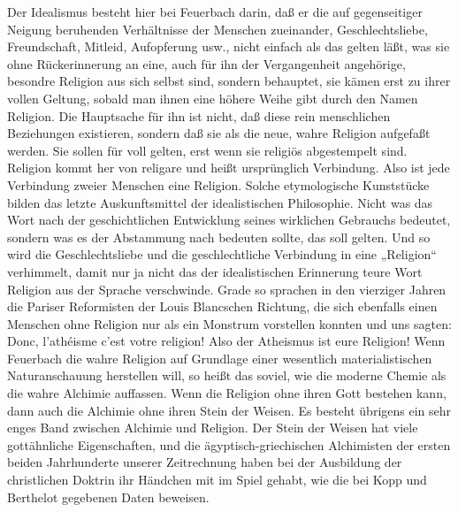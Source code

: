 Der Idealismus besteht hier bei Feuerbach darin, daß er die auf
gegenseitiger Neigung beruhenden Verhältnisse der Menschen zueinander,
Geschlechtsliebe, Freundschaft, Mitleid, Aufopferung usw., nicht einfach
als das gelten läßt, was sie ohne Rückerinnerung an eine, auch für ihn
der Vergangenheit angehörige, besondre Religion aus sich selbst sind,
sondern behauptet, sie kämen erst zu ihrer vollen Geltung, sobald man
ihnen eine höhere Weihe gibt durch den Namen Religion. Die Hauptsache
für ihn ist nicht, daß diese rein menschlichen Beziehungen existieren,
sondern daß sie als die neue, wahre Religion aufgefaßt werden. Sie
sollen für voll gelten, erst wenn sie religiös abgestempelt sind.
Religion kommt her von religare und heißt ursprünglich Verbindung. Also
ist jede Verbindung zweier Menschen eine Religion. Solche etymologische
Kunststücke bilden das letzte Auskunftsmittel der idealistischen
Philosophie. Nicht was das Wort nach der geschichtlichen Entwicklung
seines wirklichen Gebrauchs bedeutet, sondern was es der Abstammung nach
bedeuten sollte, das soll gelten. Und so wird die Geschlechtsliebe und
die geschlechtliche Verbindung in eine „Religion`` verhimmelt, damit nur
ja nicht das der idealistischen Erinnerung teure Wort Religion aus der
Sprache verschwinde. Grade so sprachen in den vierziger Jahren die
Pariser Reformisten der Louis Blancschen Richtung, die sich ebenfalls
einen Menschen ohne Religion nur als ein Monstrum vorstellen konnten und
uns sagten: Donc, l'athéisme c'est votre religion! \textbar{}Also der
Atheismus ist eure Religion!\textbar{} Wenn Feuerbach die wahre Religion
auf Grundlage einer wesentlich materialistischen Naturanschauung
herstellen will, so heißt das soviel, wie die moderne Chemie als die
wahre Alchimie auffassen. Wenn die Religion ohne ihren Gott bestehen
kann, dann auch die Alchimie ohne ihren Stein der Weisen. Es besteht
übrigens ein sehr enges Band zwischen Alchimie und Religion. Der Stein
der Weisen hat viele gottähnliche Eigenschaften, und die
ägyptisch-griechischen Alchimisten der ersten beiden Jahrhunderte
unserer Zeitrechnung haben bei der Ausbildung der christlichen Doktrin
ihr Händchen mit im Spiel gehabt, wie die bei Kopp und Berthelot
gegebenen Daten beweisen.

